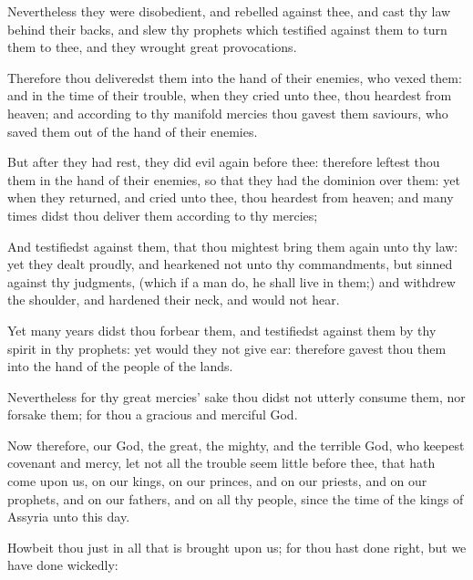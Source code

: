 {Nevertheless they were
disobedient, and
rebelled against thee, and
cast thy
law
behind their
backs, and
slew thy
prophets which
testified against them to
turn them to thee, and they
wrought
great
provocations.

Therefore thou
deliveredst them into the
hand of their
enemies, who
vexed them: and in the
time of their
trouble, when they
cried unto thee, thou
heardest
{} from
heaven; and according to thy
manifold
mercies thou
gavest them
saviours, who
saved them out of the
hand of their
enemies.

But after they had
rest, they
did
evil
again
before thee: therefore
leftest thou them in the
hand of their
enemies, so that they had the
dominion over them: yet when they
returned, and
cried unto thee, thou
heardest
{} from
heaven; and
many
times didst thou
deliver them according to thy
mercies;

And
testifiedst against them, that thou mightest bring them
again unto thy
law: yet they dealt
proudly, and
hearkened not unto thy
commandments, but
sinned against thy
judgments, (which if a
man
do, he shall
live in them;) and
withdrew the
shoulder, and
hardened their
neck, and would not
hear.

Yet
many
years didst thou
forbear them, and
testifiedst against them by thy
spirit
in thy
prophets: yet would they not give
ear: therefore
gavest thou them into the
hand of the
people of the
lands.

Nevertheless for thy
great
mercies’ sake thou
didst not utterly
consume them, nor
forsake them; for thou
{} a
gracious and
merciful
God.

Now therefore, our
God, the
great, the
mighty, and the
terrible
God, who
keepest
covenant and
mercy, let not all the
trouble seem
little
before thee, that hath
come upon us, on our
kings, on our
princes, and on our
priests, and on our
prophets, and on our
fathers, and on all thy
people, since the
time of the
kings of
Assyria unto this
day.

Howbeit thou
{}
just in all that is
brought upon us; for thou hast
done
right, but we have done
wickedly:

}
